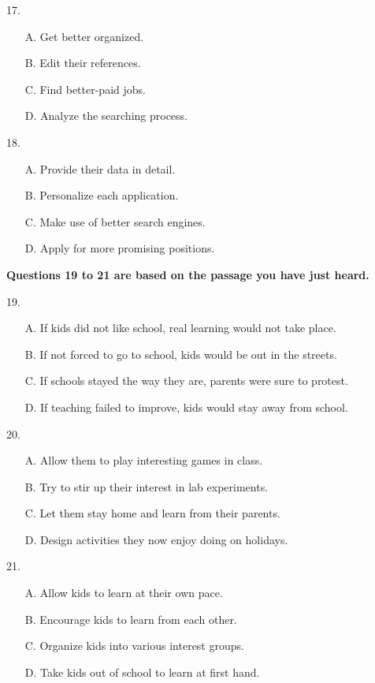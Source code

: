 \documentclass[UTF8,11pt]{ctexart}
\begin{document}
17.


\begin{itemize}[leftmargin=2em,itemsep=.2em,topsep=.4em]\item[A.] Get better organized.
\item[B.] Edit their references.
\item[C.] Find better-paid jobs.
\item[D.] Analyze the searching process.
\end{itemize}

18.


\begin{itemize}[leftmargin=2em,itemsep=.2em,topsep=.4em]\item[A.] Provide their data in detail.
\item[B.] Personalize each application.
\item[C.] Make use of better search engines.
\item[D.] Apply for more promising positions.
\end{itemize}

\textbf{Questions 19 to 21 are based on the passage you have just heard.}


19.


\begin{itemize}[leftmargin=2em,itemsep=.2em,topsep=.4em]\item[A.] If kids did not like school, real learning would not take place.
\item[B.] If not forced to go to school, kids would be out in the streets.
\item[C.] If schools stayed the way they are, parents were sure to protest.
\item[D.] If teaching failed to improve, kids would stay away from school.
\end{itemize}

20.


\begin{itemize}[leftmargin=2em,itemsep=.2em,topsep=.4em]\item[A.] Allow them to play interesting games in class.
\item[B.] Try to stir up their interest in lab experiments.
\item[C.] Let them stay home and learn from their parents.
\item[D.] Design activities they now enjoy doing on holidays.
\end{itemize}

21.


\begin{itemize}[leftmargin=2em,itemsep=.2em,topsep=.4em]\item[A.] Allow kids to learn at their own pace.
\item[B.] Encourage kids to learn from each other.
\item[C.] Organize kids into various interest groups.
\item[D.] Take kids out of school to learn at first hand.
\end{itemize}
\end{document}
